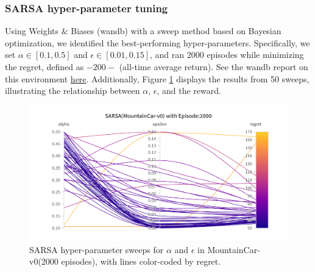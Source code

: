 \documentclass[11pt, a4]{article}
\begin{document}
			\subsubsection{SARSA  hyper-parameter tuning}
				Using Weights \& Biases (wandb) with a sweep method based on Bayesian optimization, we identified the best-performing hyper-parameters. Specifically, we set $\alpha \in [0.1, 0.5]$ and $\epsilon \in [0.01, 0.15]$, and ran 2000 episodes while minimizing the regret, defined as \(-200 -\) (all-time average return). See the wandb report on this environment \href{https://api.wandb.ai/links/ee24e009-iitm/4f545bce}{here}. Additionally, Figure \ref{fig:sarsamountaincar-regret} displays the results from 50 sweeps, illustrating the relationship between $\alpha$, $\epsilon$, and the reward.
				\begin{figure}[H]
					\centering
					\includegraphics[width=1\linewidth]{sarsa-hyp-tuning-mountaincar.png}
					\caption{SARSA hyper-parameter sweeps for $\alpha$ and $\epsilon$ in MountainCar-v0(2000 episodes), with lines color-coded by regret.}
					\label{fig:sarsamountaincar-regret}
				\end{figure}
\end{document}
